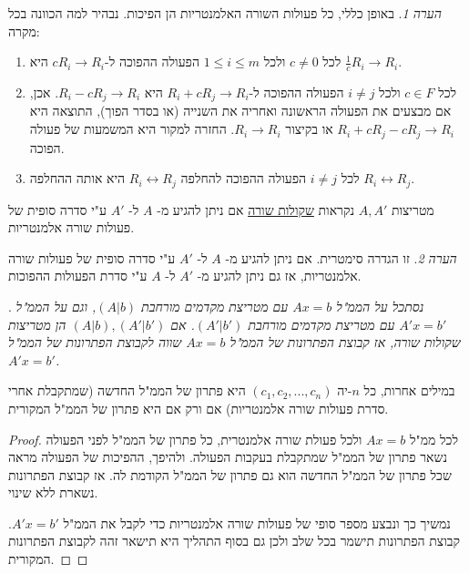 \documentclass[
  hebrew,
  12pt,
  a4paper,
  oneside]{book}
\theoremstyle{definition}
\theoremstyle{remark}
\theoremstyle{plain}
\theoremstyle{remark}
\newtheorem*{remark}{הערה}
\begin{document}
\begin{remark}
באופן כללי, כל פעולות השורה האלמנטריות הן הפיכות. נבהיר למה הכוונה בכל
מקרה:

\begin{enumerate}
\def\labelenumi{\arabic{enumi}.}
\item
  לכל \(c\neq0\) ולכל \(1\leq i\leq m\) הפעולה ההפוכה
  ל-\(cR_{i}\rightarrow R_{i}\) היא
  \(\frac{1}{c}R_{i}\rightarrow R_{i}\).
\item
  לכל \(c\in F\) ולכל \(i\neq j\) הפעולה ההפוכה
  ל-\(R_{i}+cR_{j}\rightarrow R_{i}\) היא
  \(R_{i}-cR_{j}\rightarrow R_{i}\). אכן, אם מבצעים את הפעולה הראשונה
  ואחריה את השנייה (או בסדר הפוך), התוצאה היא
  \(R_{i}+cR_{j}-cR_{j}\rightarrow R_{i}\) או בקיצור \(R_{i}\to R_{i}\).
  החזרה למקור היא המשמעות של פעולה הפוכה.
\item
  לכל \(i\neq j\) הפעולה ההפוכה להחלפה \(R_{i}\leftrightarrow R_{j}\)
  היא אותה ההחלפה \(R_{i}\leftrightarrow R_{j}\).
\end{enumerate}

\end{remark}

\begin{definition}

מטריצות \(A,A'\) נקראות \ul{שקולות שורה} אם ניתן להגיע מ- \(A\) ל-
\(A'\) ע"י סדרה סופית של פעולות שורה אלמנטריות.

\end{definition}

\begin{remark}
זו הגדרה סימטרית. אם ניתן להגיע מ- \(A\) ל- \(A'\) ע"י סדרה סופית של
פעולות שורה אלמנטריות, אז גם ניתן להגיע מ- \(A'\) ל- \(A\) ע"י סדרת
הפעולות ההפוכות.
\end{remark}

\begin{proposition}

. \emph{נסתכל על הממ"ל \(Ax=b\) עם מטריצת מקדמים מורחבת \((A|b)\), וגם
על הממ"ל \(A'x=b'\) עם מטריצת מקדמים מורחבת \((A'|b')\). אם
\((A|b),(A'|b')\) הן מטריצות שקולות שורה, אז קבוצת הפתרונות של הממ"ל
\(Ax=b\) שווה לקבוצת הפתרונות של הממ"ל \(A'x=b'\).}

\end{proposition}

במילים אחרות, כל \(n\)-יה \((c_1,c_2,...,c_n)\) היא פתרון של הממ"ל החדשה
(שמתקבלת אחרי סדרת פעולות שורה אלמנטריות) אם ורק אם היא פתרון של הממ"ל
המקורית.

\begin{proof}
לכל ממ"ל \(Ax=b\) ולכל פעולת שורה אלמנטרית, כל פתרון של הממ"ל לפני
הפעולה נשאר פתרון של הממ"ל שמתקבלת בעקבות הפעולה. ולהיפך, ההפיכות של
הפעולה מראה שכל פתרון של הממ"ל החדשה הוא גם פתרון של הממ"ל הקודמת לה. אז
קבוצת הפתרונות נשארת ללא שינוי.

נמשיך כך ונבצע מספר סופי של פעולות שורה אלמנטריות כדי לקבל את הממ"ל
\(A'x=b'\). קבוצת הפתרונות תישמר בכל שלב ולכן גם בסוף התהליך היא תישאר
זהה לקבוצת הפתרונות המקורית.~◻
\end{proof}
\end{document}
